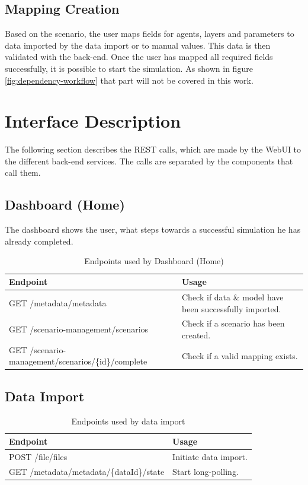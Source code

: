 \subsection{Mapping Creation}
Based on the scenario, the user maps fields for agents, layers and parameters to data imported by the data import or to manual values. This data is then validated with the back-end. Once the user has mapped all required fields successfully, it is possible to start the simulation. As shown in figure \ref{fig:dependency-workflow} that part will not be covered in this work.



\section{Interface Description}
The following section describes the REST calls, which are made by the WebUI to the different back-end services. The calls are separated by the components that call them.


\subsection{Dashboard (Home)}
The dashboard shows the user, what steps towards a successful simulation he has already completed.
\begin{table}[H]
	\caption{Endpoints used by Dashboard (Home)}
	\begin{tabularx}{\textwidth}{|l|X|}
		\hline
		\textbf{Endpoint} & \textbf{Usage} \\ \hline
		GET /metadata/metadata & Check if data \& model have been successfully imported. \\ \hline
		GET /scenario-management/scenarios & Check if a scenario has been created.\\ \hline
		GET /scenario-management/scenarios/\{id\}/complete & Check if a valid mapping exists.\\ \hline
	\end{tabularx}
\end{table}


\subsection{Data Import}
\begin{table}[H]
	\caption{Endpoints used by data import}
	\begin{tabularx}{\textwidth}{|l|X|}
		\hline
		\textbf{Endpoint} & \textbf{Usage} \\ \hline
		POST /file/files & Initiate data import.\\ \hline
		GET /metadata/metadata/\{dataId\}/state & Start long-polling. \\ \hline
	\end{tabularx}
\end{table}


